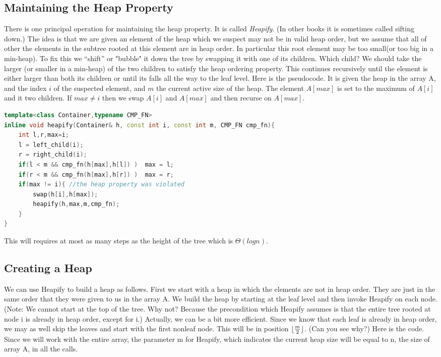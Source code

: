 \subsection{Maintaining the Heap Property}
There is one principal operation for maintaining the heap property. It is
called \textit{Heapify}. (In other books it is sometimes called sifting down.) The idea is that we are given an element of the heap which we suspect may not be in valid heap order, but we assume that all of other the elements in the subtree rooted at this element are in heap order. In particular this root element may be too small(or too big in a min-heap). To fix this we “shift” or "bubble" it down the tree by swapping it with one of its children. Which child? We should take the larger (or smaller in a min-heap) of the two children to satisfy the heap ordering property. This continues recursively until the element is either larger than both its children or until its falls all the way to the leaf level. Here is the pseudocode. It is given the heap in the array A, and the index $i$ of the suspected element, and $m$ the current active size of the heap. The element $A[max]$ is set to the maximum of $A[i]$ and it two children. If $max \neq i$ then we swap $A[i]$ and $A[max]$ and then recurse on $A[max]$.


\begin{lstlisting}[language=c++, caption="Heapify procedure in heapsort"]
template<class Container,typename CMP_FN>
inline void heapify(Container& h, const int i, const int m, CMP_FN cmp_fn){
    int l,r,max=i;
    l = left_child(i);
    r = right_child(i);
    if(l < m && cmp_fn(h[max],h[l]) )  max = l;
    if(r < m && cmp_fn(h[max],h[r]) )  max = r;
    if(max != i){ //the heap property was violated
        swap(h[i],h[max]);
        heapify(h,max,m,cmp_fn);
    }
}
\end{lstlisting}
This will requires at most as many steps as the height of the tree which is $\mathcal{\Theta}(log n)$.
\subsection{Creating a Heap}
\label{sect:createheap}
We can use Heapify to build a heap as follows. First we start with a heap in which the elements are not in heap order. They are just in the same order that they were given to us in the array A. We build the heap by starting at the leaf level and then invoke Heapify on each node. (Note: We cannot start at the top of the tree. Why not? Because the precondition which Heapify assumes is that the entire tree rooted at node i is already in heap order, except for i.) Actually, we can be a bit more efficient. Since we know that each leaf is already in heap order, we may as well skip the leaves and start with the first nonleaf node. This will be in position $\lfloor\frac{m}{2}\rfloor$. (Can you see why?)
Here is the code. Since we will work with the entire array, the parameter m for Heapify, which indicates
the current heap size will be equal to n, the size of array A, in all the calls.

